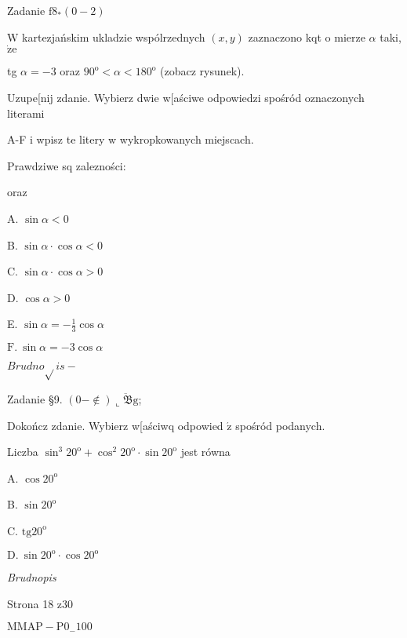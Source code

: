 \documentclass[a4paper,12pt]{article}
\begin{document}
Zadanie $\mathrm{f}8_{*}(0-2)$

$\mathrm{W}$ kartezjańskim ukladzie wspólrzednych $(x,y)$ zaznaczono kqt o mierze $\alpha$ taki, $\dot{\mathrm{z}}\mathrm{e}$

tg $\alpha=-3$ oraz $90^{\mathrm{o}}<\alpha<180^{\mathrm{o}}$ (zobacz rysunek).

Uzupe[nij zdanie. Wybierz dwie w[aściwe odpowiedzi spośród oznaczonych literami

A-F i wpisz te litery w wykropkowanych miejscach.

Prawdziwe sq zalezności:

oraz

A. $\sin\alpha<0$

B. $\sin\alpha\cdot\cos\alpha<0$

C. $\sin\alpha\cdot\cos\alpha>0$

D. $\cos\alpha>0$

E. $\displaystyle \sin\alpha=-\frac{1}{3}\cos\alpha$

$\mathrm{F}.\ \sin\alpha=-3\cos\alpha$

$Brudno\sqrt{}is -$

Zadanie \S 9. $(0-\not\in) \overline{\llcorner \mathfrak{B}\mathrm{g}}$;

Dokończ zdanie. Wybierz w[aściwq odpowied $\acute{\mathrm{z}}$ spośród podanych.

Liczba $\sin^{3}20^{\mathrm{o}}+\cos^{2}20^{\mathrm{o}}\cdot\sin 20^{\mathrm{o}}$ jest równa

A. $\cos 20^{\mathrm{o}}$

B. $\sin 20^{\mathrm{o}}$

C. $\mathrm{t}\mathrm{g}20^{\mathrm{o}}$

$\mathrm{D}.\ \sin 20^{\mathrm{o}}\cdot\cos 20^{\mathrm{o}}$

{\it Brudnopis}

Strona 18 z30

$\mathrm{M}\mathrm{M}\mathrm{A}\mathrm{P}-\mathrm{P}0_{-}100$
\end{document}

